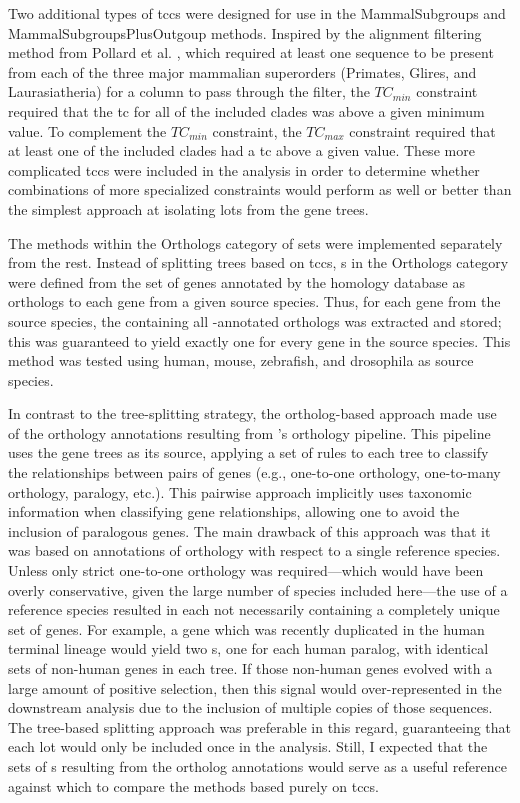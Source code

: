Two additional types of \acp{tcc} were designed for use in the
MammalSubgroups and MammalSubgroupsPlusOutgoup methods. Inspired by
the alignment filtering method from Pollard et
al. \citeyearpar{Pollard2010}, which required at least one sequence to
be present from each of the three major mammalian superorders
(Primates, Glires, and Laurasiatheria) for a column to pass through
the filter, the $TC_{min}$ constraint required that the \ac{tc} for all
of the included clades was above a given minimum value. To complement
the $TC_{min}$ constraint, the $TC_{max}$ constraint required that at
least one of the included clades had a \ac{tc} above a given
value. These more complicated \acp{tcc} were included in the analysis
in order to determine whether combinations of more specialized
constraints would perform as well or better than the simplest approach
at isolating \acp{lot} from the \cmp gene trees.

The methods within the Orthologs category of \subtr{} sets were
implemented separately from the rest. Instead of splitting \cmp trees
based on \acp{tcc}, \subtr{}s in the Orthologs category were defined
from the set of genes annotated by the \ens homology database as
orthologs to each gene from a given source species. Thus, for each
gene from the source species, the \cmp \subtr containing all
\ens{}-annotated orthologs was extracted and stored; this was
guaranteed to yield exactly one \subtr{} for every gene in the source
species. This method was tested using human, mouse, zebrafish, and
drosophila as source species.

In contrast to the tree-splitting strategy, the ortholog-based
approach made use of the orthology annotations resulting from \ens{}'s
orthology pipeline.  This pipeline uses the \cmp gene trees as its
source, applying a set of rules to each tree to classify the
relationships between pairs of genes (e.g., one-to-one orthology,
one-to-many orthology, paralogy, etc.). This pairwise approach
implicitly uses taxonomic information when classifying gene
relationships, allowing one to avoid the inclusion of paralogous
genes. The main drawback of this approach was that it was based on
annotations of orthology with respect to a single reference
species. Unless only strict one-to-one orthology was required---which
would have been overly conservative, given the large number of species
included here---the use of a reference species resulted in each
\subtr{} not necessarily containing a completely unique set of
genes. For example, a gene which was recently duplicated in the human
terminal lineage would yield two \subtr{}s, one for each human
paralog, with identical sets of non-human genes in each tree. If those
non-human genes evolved with a large amount of positive selection,
then this signal would over-represented in the downstream analysis due
to the inclusion of multiple copies of those sequences. The tree-based
\subtr splitting approach was preferable in this regard, guaranteeing
that each \ac{lot} would only be included once in the analysis. Still,
I expected that the sets of \subtr{}s resulting from the \ens ortholog
annotations would serve as a useful reference against which to compare
the methods based purely on \acp{tcc}.

